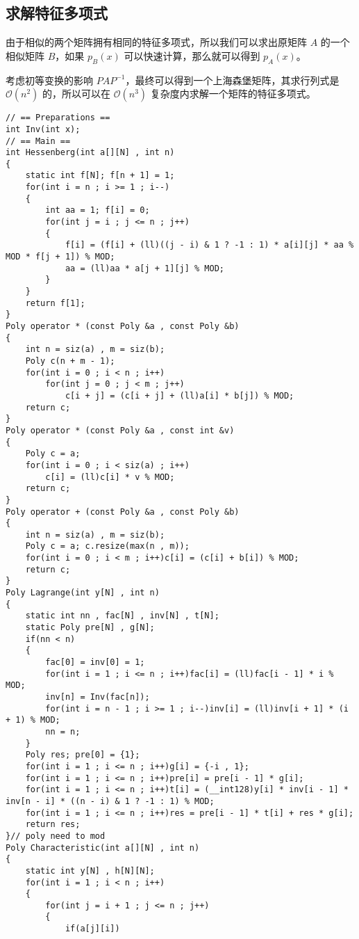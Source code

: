 \subsection{求解特征多项式}

由于相似的两个矩阵拥有相同的特征多项式，所以我们可以求出原矩阵 $A$ 的一个相似矩阵 $B$，如果 $p_B(x)$ 可以快速计算，那么就可以得到 $p_A(x)$。

考虑初等变换的影响 $PAP^{-1}$，最终可以得到一个上海森堡矩阵，其求行列式是 $\mathcal{O}(n^2)$ 的，所以可以在 $\mathcal{O}(n^3)$ 复杂度内求解一个矩阵的特征多项式。

\begin{verbatim}
// == Preparations ==
int Inv(int x);
// == Main ==
int Hessenberg(int a[][N] , int n)
{
    static int f[N]; f[n + 1] = 1;
    for(int i = n ; i >= 1 ; i--)
    {
        int aa = 1; f[i] = 0;
        for(int j = i ; j <= n ; j++)
        {
            f[i] = (f[i] + (ll)((j - i) & 1 ? -1 : 1) * a[i][j] * aa % MOD * f[j + 1]) % MOD;
            aa = (ll)aa * a[j + 1][j] % MOD;
        }
    }
    return f[1];
}
Poly operator * (const Poly &a , const Poly &b)
{
    int n = siz(a) , m = siz(b);
    Poly c(n + m - 1);
    for(int i = 0 ; i < n ; i++)
        for(int j = 0 ; j < m ; j++)
            c[i + j] = (c[i + j] + (ll)a[i] * b[j]) % MOD;
    return c;
}
Poly operator * (const Poly &a , const int &v)
{
    Poly c = a;
    for(int i = 0 ; i < siz(a) ; i++)
        c[i] = (ll)c[i] * v % MOD;
    return c;
}
Poly operator + (const Poly &a , const Poly &b)
{
    int n = siz(a) , m = siz(b);
    Poly c = a; c.resize(max(n , m));
    for(int i = 0 ; i < m ; i++)c[i] = (c[i] + b[i]) % MOD;
    return c;
}
Poly Lagrange(int y[N] , int n)
{
    static int nn , fac[N] , inv[N] , t[N]; 
    static Poly pre[N] , g[N];
    if(nn < n)
    {
        fac[0] = inv[0] = 1;
        for(int i = 1 ; i <= n ; i++)fac[i] = (ll)fac[i - 1] * i % MOD;
        inv[n] = Inv(fac[n]);
        for(int i = n - 1 ; i >= 1 ; i--)inv[i] = (ll)inv[i + 1] * (i + 1) % MOD;
        nn = n;
    }
    Poly res; pre[0] = {1};
    for(int i = 1 ; i <= n ; i++)g[i] = {-i , 1};
    for(int i = 1 ; i <= n ; i++)pre[i] = pre[i - 1] * g[i];
    for(int i = 1 ; i <= n ; i++)t[i] = (__int128)y[i] * inv[i - 1] * inv[n - i] * ((n - i) & 1 ? -1 : 1) % MOD;
    for(int i = 1 ; i <= n ; i++)res = pre[i - 1] * t[i] + res * g[i];
    return res;
}// poly need to mod
Poly Characteristic(int a[][N] , int n)
{
    static int y[N] , h[N][N];
    for(int i = 1 ; i < n ; i++)
    {
        for(int j = i + 1 ; j <= n ; j++)
        {
            if(a[j][i])

\end{verbatim}
